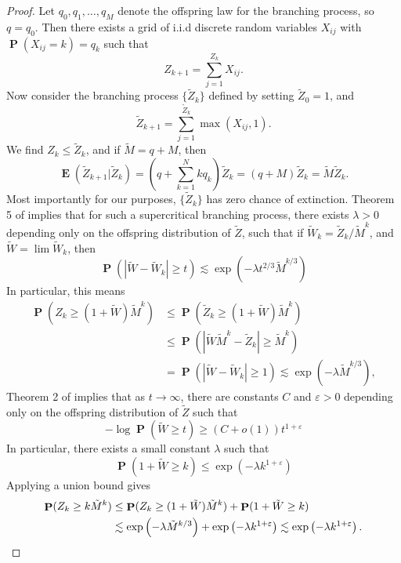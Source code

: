 \documentclass[dvipsnames,letterpaper,12pt]{article}
\numberwithin{equation}{section}
\theoremstyle{plain}
\theoremstyle{remark}
\DeclareMathOperator{\Prob}{\mathbf{P}}
\DeclareMathOperator{\Expect}{\mathbf{E}}
\begin{document}
\begin{proof}
	Let $q_0, q_1, \dots, q_M$ denote the offspring law for the branching process, so $q = q_0$. Then there exists a grid of i.i.d discrete random variables $X_{ij}$ with $\Prob(X_{ij} = k) = q_k$ such that
	\[ Z_{k+1} = \sum_{j = 1}^{Z_k} X_{ij}. \]
	Now consider the branching process $\{ \tilde{Z}_k \}$ defined by setting $\tilde{Z}_0 = 1$, and
	\[ \tilde{Z}_{k+1} = \sum_{j = 1}^{\tilde{Z}_k} \max(X_{ij}, 1). \]
	We find $Z_k \leq \tilde{Z}_k$, and if $\tilde{M} = q + M$, then
	\[ \Expect(\tilde{Z}_{k+1}|\tilde{Z}_k) = \left( q + \sum_{k = 1}^N k q_k \right) \tilde{Z}_k = (q + M) \tilde{Z}_k = \tilde{M} \tilde{Z}_k. \]
	Most importantly for our purposes, $\{ \tilde{Z}_k \}$ has zero chance of extinction. Theorem 5 of \cite{Athreya} implies that for such a supercritical branching process, there exists $\lambda > 0$ depending only on the offspring distribution of $\tilde{Z}$, such that if $\tilde{W}_k = \tilde{Z}_k / \tilde{M}^k$, and $\tilde{W} = \lim \tilde{W}_k$, then
	\[ \Prob(| \tilde{W} - \tilde{W}_k | \geq t) \lesssim \exp \left( - \lambda t^{2/3} \tilde{M}^{k/3} \right) \]
	In particular, this means
	\begin{align*}
		\Prob \left( Z_k \geq (1 + \tilde{W}) \tilde{M}^k \right) &\leq \Prob( \tilde{Z}_k \geq (1 + \tilde{W}) \tilde{M}^k )\\
		&\leq \Prob \left( | \tilde{W} \tilde{M}^k - \tilde{Z}_k | \geq \tilde{M}^k \right)\\
		&= \Prob \left( | \tilde{W} - \tilde{W}_k| \geq 1 \right) \lesssim \exp \left( - \lambda \tilde{M}^{k/3} \right),
	\end{align*}
	Theorem 2 of \cite{Biggins} implies that as $t \to \infty$, there are constants $C$ and $\varepsilon > 0$ depending only on the offspring distribution of $\tilde{Z}$ such that
	\[ - \log \Prob(\tilde{W} \geq t) \geq (C + o(1)) t^{1 + \varepsilon} \]
	In particular, there exists a small constant $\lambda$ such that
	\[ \Prob(1 + \tilde{W} \geq k) \leq \exp \left( - \lambda k^{1 + \varepsilon} \right) \]
	Applying a union bound gives
	\begin{align*}
		\Prob(Z_k \geq k \tilde{M}^k ) &\leq \Prob( Z_k \geq (1 + \tilde{W}) \tilde{M}^k ) + \Prob(1 + \tilde{W} \geq k)\\
		&\lesssim \exp \left( - \lambda \tilde{M}^{k/3} \right) + \exp \left( - \lambda k^{1 + \varepsilon} \right) \lesssim \exp \left( - \lambda k^{1 + \varepsilon} \right). \qedhere
	\end{align*}
\end{proof}
\end{document}
